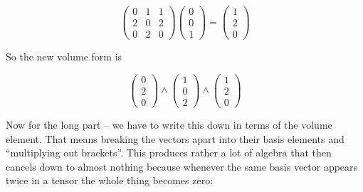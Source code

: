 \documentclass[oneside,english]{amsbook}
\numberwithin{section}{chapter}
\theoremstyle{plain}
\theoremstyle{definition}
\begin{document}
\[\begin{pmatrix}
	0 & 1 & 1 \\
	2 & 0 & 2 \\
	0 & 2 & 0
\end{pmatrix}\begin{pmatrix}
	0 \\
	0 \\
	1
\end{pmatrix} = \begin{pmatrix}
	1 \\
	2 \\
	0
\end{pmatrix}\]

So the new volume form is

\[\begin{pmatrix}
	0 \\
	2 \\
	0
\end{pmatrix} \land \begin{pmatrix}
	1 \\
	0 \\
	2
\end{pmatrix} \land \begin{pmatrix}
	1 \\
	2 \\
	0
\end{pmatrix}\]

Now for the long part -- we have to write this down in terms of the
volume element. That means breaking the vectors apart into their basis
elements and ``multiplying out brackets''. This produces rather a lot of
algebra that then cancels down to almost nothing because whenever the
same basis vector appears twice in a tensor the whole thing becomes
zero:
\end{document}
